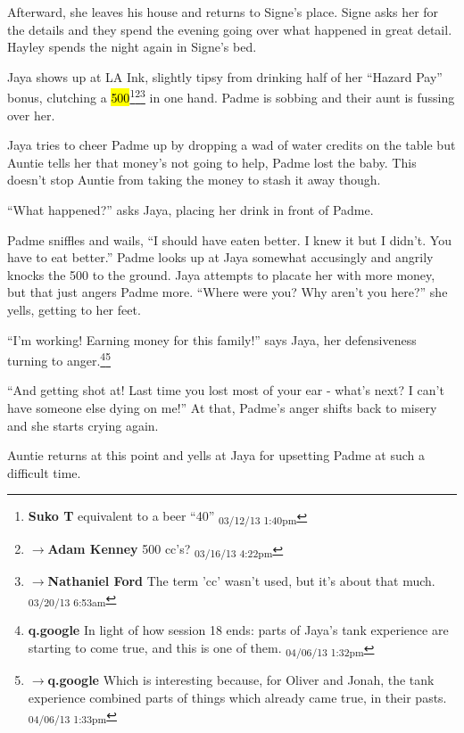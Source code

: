 Afterward, she leaves his house and returns to Signe's place.  Signe asks her for the details and they spend the evening going over what happened in great detail.  Hayley spends the night again in Signe's bed.



Jaya shows up at LA Ink, slightly tipsy from drinking half of her ``Hazard Pay'' bonus, clutching a \hl{500}\footnote{\textbf{Suko T }equivalent to a beer ``40'' \textsubscript{03/12/13 1:40pm}}\footnote{$\rightarrow$\textbf{Adam Kenney }500 cc's? \textsubscript{03/16/13 4:22pm}}\footnote{$\rightarrow$\textbf{Nathaniel Ford }The term 'cc' wasn't used, but it's about that much. \textsubscript{03/20/13 6:53am}} in one hand.  Padme is sobbing and their aunt is fussing over her. 



Jaya tries to cheer Padme up by dropping a wad of water credits on the table but Auntie tells her that money's not going to help, Padme lost the baby.  This doesn't stop Auntie from taking the money to stash it away though.



``What happened?'' asks Jaya, placing her drink in front of Padme.

Padme sniffles and wails, ``I should have eaten better.  I knew it but I didn't.  You have to eat better.''  Padme looks up at Jaya somewhat accusingly and angrily knocks the 500 to the ground.  Jaya attempts to placate her with more money, but that just angers Padme more.  ``Where were you?  Why aren't you here?'' she yells, getting to her feet.

``I'm working!  Earning money for this family!'' says Jaya, her defensiveness turning to anger.\footnote{\textbf{q.google }In light of how session 18 ends: parts of Jaya's tank experience are starting to come true, and this is one of them. \textsubscript{04/06/13 1:32pm}}\footnote{$\rightarrow$\textbf{q.google }Which is interesting because, for Oliver and Jonah, the tank experience combined parts of things which already came true, in their pasts. \textsubscript{04/06/13 1:33pm}}

``And getting shot at! Last time you lost most of your ear - what's next?  I can't have someone else dying on me!'' At that, Padme's anger shifts back to misery and she starts crying again.



Auntie returns at this point and yells at Jaya for upsetting Padme at such a difficult time.  



